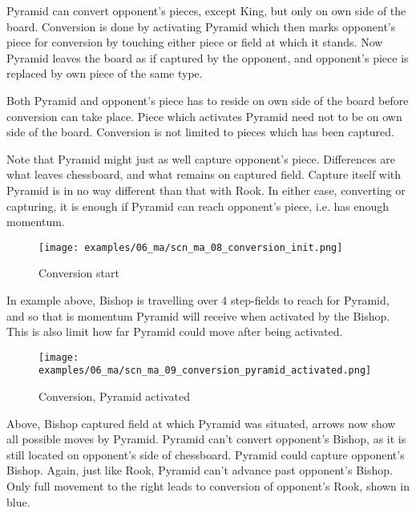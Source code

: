 Pyramid can convert opponent's pieces, except King, but only on own side of
the board. Conversion is done by activating Pyramid which then marks opponent's
piece for conversion by touching either piece or field at which it stands. Now
Pyramid leaves the board as if captured by the opponent, and opponent's piece
is replaced by own piece of the same type.

Both Pyramid and opponent's piece has to reside on own side of the board before
conversion can take place. Piece which activates Pyramid need not to be on own
side of the board. Conversion is not limited to pieces which has been captured.

Note that Pyramid might just as well capture opponent's piece. Differences are
what leaves chessboard, and what remains on captured field. Capture itself with
Pyramid is in no way different than that with Rook. In either case, converting
or capturing, it is enough if Pyramid can reach opponent's piece, i.e. has
enough momentum.

\clearpage %

\noindent
\begin{figure}[!h]
\texttt{[image: examples/06\_ma/scn\_ma\_08\_conversion\_init.png]}
\caption{Conversion start}
\label{fig:scn_ma_08_conversion_init}
\end{figure}

In example above, Bishop is travelling over 4 step-fields to reach for Pyramid,
and so that is momentum Pyramid will receive when activated by the Bishop.
This is also limit how far Pyramid could move after being activated.

\clearpage %

\noindent
\begin{figure}[!h]
\texttt{[image: examples/06\_ma/scn\_ma\_09\_conversion\_pyramid\_activated.png]}
\caption{Conversion, Pyramid activated}
\label{fig:scn_ma_09_conversion_pyramid_activated}
\end{figure}

Above, Bishop captured field at which Pyramid was situated, arrows now show all
possible moves by Pyramid. Pyramid can't convert opponent's Bishop, as it is still
located on opponent's side of chessboard. Pyramid could capture opponent's Bishop.
Again, just like Rook, Pyramid can't advance past opponent's Bishop. Only full
movement to the right leads to conversion of opponent's Rook, shown in blue.

